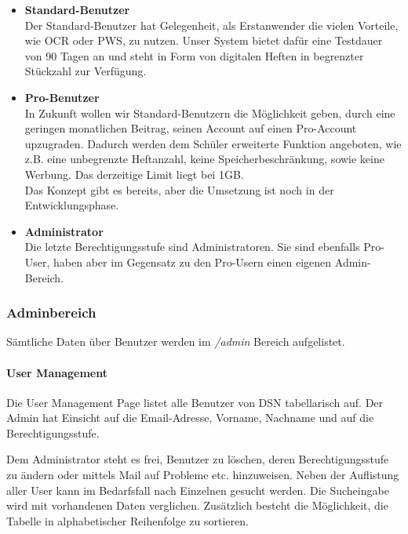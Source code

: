 \begin{itemize}
\item \textbf{Standard-Benutzer}\\ Der Standard-Benutzer hat Gelegenheit, als Erstanwender die vielen Vorteile, wie OCR oder PWS, zu nutzen. Unser System bietet dafür eine Testdauer von 90 Tagen an und steht in Form von digitalen Heften in begrenzter Stückzahl zur Verfügung.
\item \textbf{Pro-Benutzer}\\ In Zukunft wollen wir Standard-Benutzern die Möglichkeit geben, durch eine geringen monatlichen Beitrag, seinen Account auf einen Pro-Account upzugraden. Dadurch werden dem Schüler erweiterte Funktion angeboten, wie z.B. eine unbegrenzte Heftanzahl, keine Speicherbeschränkung, sowie keine Werbung. Das derzeitige Limit liegt bei 1GB.\\
Das Konzept gibt es bereits, aber die Umsetzung ist noch in der Entwicklungsphase.
\item \textbf{Administrator}\\ Die letzte Berechtigungsstufe sind Administratoren. Sie sind ebenfalls Pro-User, haben aber im Gegensatz zu den Pro-Usern einen eigenen Admin-Bereich.
\end{itemize}

\subsubsection{Adminbereich}
Sämtliche Daten über Benutzer werden im \textit{/admin} Bereich aufgelistet. 
\paragraph{User Management}
Die User Management Page listet alle Benutzer von DSN tabellarisch auf. Der Admin hat Einsicht auf die Email-Adresse, Vorname, Nachname und auf die Berechtigungsstufe.

\newpage

Dem Administrator steht es frei, Benutzer zu löschen, deren Berechtigungsstufe zu ändern oder mittels Mail auf Probleme etc. hinzuweisen. Neben der Auflistung aller User kann im Bedarfsfall nach Einzelnen gesucht werden. Die Sucheingabe wird mit vorhandenen Daten verglichen. Zusätzlich besteht die Möglichkeit, die Tabelle in alphabetischer Reihenfolge zu sortieren.


